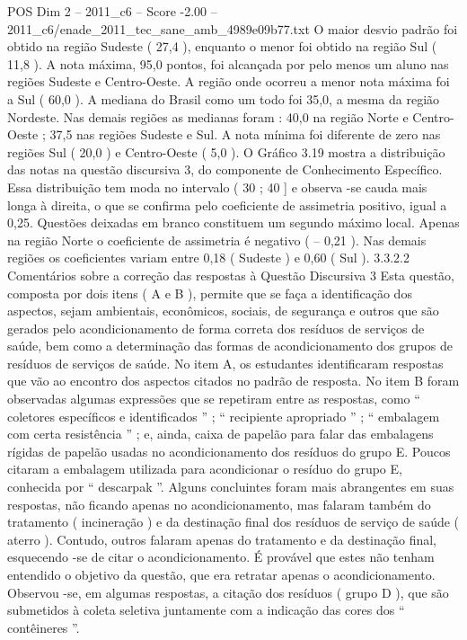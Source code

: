\begin{textsample}{POS Dim 2 – 2011\_c6 – Score -2.00 – 2011\_c6/enade\_2011\_tec\_sane\_amb\_4989e09b77.txt}
O maior desvio padrão foi obtido na região Sudeste ( 27,4 ), enquanto o menor foi obtido na região Sul ( 11,8 ).
A nota máxima, 95,0 pontos, foi alcançada por pelo menos um aluno nas regiões Sudeste e Centro-Oeste.
A região onde ocorreu a menor nota máxima foi a Sul ( 60,0 ).
A mediana do Brasil como um todo foi 35,0, a mesma da região Nordeste.
Nas demais regiões as medianas foram : 40,0 na região Norte e Centro-Oeste ; 37,5 nas regiões Sudeste e Sul.
A nota mínima foi diferente de zero nas regiões Sul ( 20,0 ) e Centro-Oeste ( 5,0 ).
O Gráfico 3.19 mostra a distribuição das notas na questão discursiva 3, do componente de Conhecimento Específico.
Essa distribuição tem moda no intervalo ( 30 ; 40 ] e observa -se cauda mais longa à direita, o que se confirma pelo coeficiente de assimetria positivo, igual a 0,25.
Questões deixadas em branco constituem um segundo máximo local.
Apenas na região Norte o coeficiente de assimetria é negativo ( – 0,21 ).
Nas demais regiões os coeficientes variam entre 0,18 ( Sudeste ) e 0,60 ( Sul ). 3.3.2.2 Comentários sobre a correção das respostas à Questão Discursiva 3 Esta questão, composta por dois itens ( A e B ), permite que se faça a identificação dos aspectos, sejam ambientais, econômicos, sociais, de segurança e outros que são gerados pelo acondicionamento de forma correta dos resíduos de serviços de saúde, bem como a determinação das formas de acondicionamento dos grupos de resíduos de serviços de saúde.
No item A, os estudantes identificaram respostas que vão ao encontro dos aspectos citados no padrão de resposta.
No item B foram observadas algumas expressões que se repetiram entre as respostas, como “ coletores específicos e identificados ” ; “ recipiente apropriado ” ; “ embalagem com certa resistência ” ; e, ainda, caixa de papelão para falar das embalagens rígidas de papelão usadas no acondicionamento dos resíduos do grupo E.
Poucos citaram a embalagem utilizada para acondicionar o resíduo do grupo E, conhecida por “ descarpak ”.
Alguns concluintes foram mais abrangentes em suas respostas, não ficando apenas no acondicionamento, mas falaram também do tratamento ( incineração ) e da destinação final dos resíduos de serviço de saúde ( aterro ).
Contudo, outros falaram apenas do tratamento e da destinação final, esquecendo -se de citar o acondicionamento.
É provável que estes não tenham entendido o objetivo da questão, que era retratar apenas o acondicionamento.
Observou -se, em algumas respostas, a citação dos resíduos ( grupo D ), que são submetidos à coleta seletiva juntamente com a indicação das cores dos “ contêineres ”.

\end{textsample}
